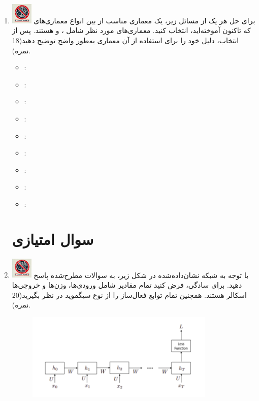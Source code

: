 \documentclass[12pt]{article}
\begin{document}
\begin{enumerate}
    \item \includegraphics[width=1cm]{figs/Forbidden_AI.jpg}
    برای حل هر یک از مسائل زیر، یک معماری مناسب از بین انواع معماری‌های  که تاکنون آموخته‌اید، انتخاب کنید. معماری‌های مورد نظر شامل ،  و  هستند. پس از انتخاب، دلیل خود را برای استفاده از آن معماری به‌طور واضح توضیح دهید(18 نمره).
    \begin{itemize}
        \item {} : \textcolor{blue}{}
        \item {} : \textcolor{blue}{}
        \item {} : \textcolor{blue}{}
        \item {} : \textcolor{blue}{}
        \item {} : \textcolor{blue}{}
        \item {} : \textcolor{blue}{}
        \item {} : \textcolor{blue}{}
        \item {} : \textcolor{blue}{}
        \item {} : \textcolor{blue}{}

    \end{itemize}
    \section*{سوال امتیازی}
    \item \includegraphics[width=1cm]{figs/Forbidden_AI.jpg}
    با توجه به شبکه نشان‌داده‌شده در شکل زیر، به سوالات مطرح‌شده پاسخ دهید. برای سادگی، فرض کنید تمام مقادیر شامل ورودی‌ها، وزن‌ها و خروجی‌ها اسکالر هستند. همچنین تمام توابع فعال‌ساز را از نوع سیگموید  در نظر بگیرید(20 نمره).
    \begin{figure}[h]  
        \centering
        \includegraphics[width=0.85\textwidth]{figs/Q4.png}
        \label{fig:num_pic}  
    \end{figure}


\end{enumerate}
\end{document}
